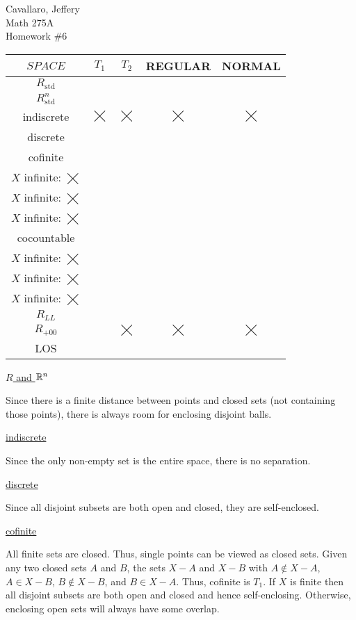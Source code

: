 \documentclass[letterpaper,12pt,fleqn]{article}
\renewcommand{\C}{\checkmark}
\newcommand{\X}{\(\bigtimes\)}
\newcommand{\A}{
  \begin{minipage}{1in}
    \(X\) finite: \C \\
    \(X\) infinite: \X
  \end{minipage}
}
\begin{document}
Cavallaro, Jeffery \\
Math 275A \\
Homework \#6

\bigskip

\begin{example}[Exercise 4.13]
  \setlength\extrarowheight{2ex}
  \begin{tabular}{|c|c|c|c|c|}
    \hline
    \(SPACE\) & \(T_1\) & \(T_2\) & REGULAR & NORMAL \\
    \hline
    \(R_{\text{std}}\) & \C & \C & \C & \C \\
    \hline
    \(R^n_{\text{std}}\) & \C & \C & \C & \C \\
    \hline
    indiscrete & \X & \X & \X & \X \\
    \hline
    discrete & \C & \C & \C & \C \\
    \hline
    cofinite & \C & \A & \A & \A \\
    \hline
    cocountable & \C & \A & \A & \A \\
    \hline
    \(R_{LL}\) & \C & \C & \C & \C \\
    \hline
    \(R_{+00}\) & \C & \X & \X & \X \\
    \hline
    LOS & \C & \C & \C & \C \\
    \hline
  \end{tabular}

  \bigskip

  \underline{\(R\) and \(\mathbb{R}^n\)}

  Since there is a finite distance between points and closed sets (not containing those points), there is always room
  for enclosing disjoint balls.

  \underline{indiscrete}

  Since the only non-empty set is the entire space, there is no separation.

  \underline{discrete}

  Since all disjoint subsets are both open and closed, they are self-enclosed.

  \underline{cofinite}

  All finite sets are closed.  Thus, single points can be viewed as closed sets.  Given any two closed sets \(A\) and
  \(B\), the sets \(X-A\) and \(X-B\) with \(A\notin X-A\), \(A\in X-B\), \(B\notin X-B\), and \(B\in X-A\).  Thus,
  cofinite is \(T_1\).  If \(X\) is finite then all disjoint subsets are both open and closed and hence
  self-enclosing.  Otherwise, enclosing open sets will always have some overlap.


\end{example}
\end{document}
